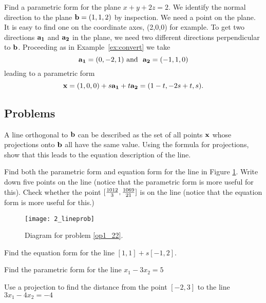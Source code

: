 \begin{example}
Find a parametric form for the plane $x + y + 2z = 2$.
{\rm We identify the normal direction to the plane ${\bf b} = (1,1,2)$ by inspection. We need a point on the plane. It is easy to find one on the coordinate axes, (2,0,0) for example. To get two directions $\bf a_1$ and $\bf a_2$ in the plane, we need two different directions perpendicular to $\bf b$. Proceeding as in Example~\ref{ex:convert} we take 
\[
{\bf a_1} = (0,-2,1) \mbox{\ and \ } {\bf a_2} = (-1,1,0)
\]
leading to a parametric form 
\[
{\bf x} = (1,0,0) +s {\bf a_1} + t {\bf a_2} = (1-t, -2s+t, s) .
\]
}
\end{example}

\subsection{Problems}

\begin{problem}
\label{op1_21}
A line orthogonal to ${\bf b}$ can be described as the set of all points ${\bf x}$
whose projections onto ${\bf b}$ all have the same value.
Using the formula for projections, show that this leads to the
equation description of the line.
\end{problem}

\begin{problem}
\label{op1_22}
Find both the parametric form and equation form for the line in Figure 
\ref{fig_lineprob}.
Write down five points on the line (notice that the parametric form is 
more useful for this). Check whether the point 
$[{{1012}\over{3}},{{1069}\over{21}}]$ is on the line
(notice that the equation form is more useful for this.)
\end{problem}

\begin{figure}
\centerline{\texttt{[image: 2\_lineprob]}}
\caption{Diagram for problem \ref{op1_22}. \label{fig_lineprob}}
\end{figure}

\begin{problem}
\label{op1_23}
Find the equation form for the line $[1,1] + s[-1,2]$.
\end{problem}

\begin{problem}
\label{op1_24}
Find the parametric form for the line $x_1-3x_2=5$
\end{problem}

\begin{problem}
\label{op1_25}
Use a projection to find the distance from the point $[-2,3]$ to the line
$3x_1-4x_2=-4$
\end{problem}

